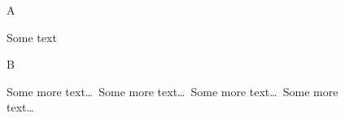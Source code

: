 \documentclass{thesis}
\begin{document}
\begin{figure}
\centering A
\caption{Some text}
\end{figure}
\begin{figure}
\centering B
\caption{Some more text\ldots\ Some more text\ldots\ Some more text\ldots\ Some more text\ldots}
\end{figure}
\end{document}
